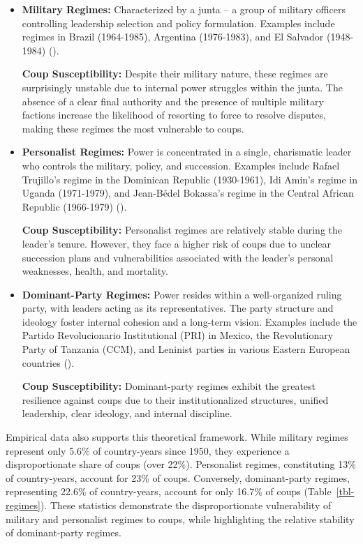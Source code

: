 \documentclass[
  12pt,
]{report}
\begin{document}
\begin{itemize}
\item
  \textbf{Military Regimes:} Characterized by a junta -- a group of
  military officers controlling leadership selection and policy
  formulation. Examples include regimes in Brazil (1964-1985), Argentina
  (1976-1983), and El Salvador (1948-1984)
  ().

  \textbf{Coup Susceptibility:} Despite their military nature, these
  regimes are surprisingly unstable due to internal power struggles
  within the junta. The absence of a clear final authority and the
  presence of multiple military factions increase the likelihood of
  resorting to force to resolve disputes, making these regimes the most
  vulnerable to coups.
\item
  \textbf{Personalist Regimes:} Power is concentrated in a single,
  charismatic leader who controls the military, policy, and succession.
  Examples include Rafael Trujillo's regime in the Dominican Republic
  (1930-1961), Idi Amin's regime in Uganda (1971-1979), and Jean-Bédel
  Bokassa's regime in the Central African Republic (1966-1979)
  ().

  \textbf{Coup Susceptibility:} Personalist regimes are relatively
  stable during the leader's tenure. However, they face a higher risk of
  coups due to unclear succession plans and vulnerabilities associated
  with the leader's personal weaknesses, health, and mortality.
\item
  \textbf{Dominant-Party Regimes:} Power resides within a well-organized
  ruling party, with leaders acting as its representatives. The party
  structure and ideology foster internal cohesion and a long-term
  vision. Examples include the Partido Revolucionario Institutional
  (PRI) in Mexico, the Revolutionary Party of Tanzania (CCM), and
  Leninist parties in various Eastern European countries
  ().

  \textbf{Coup Susceptibility:} Dominant-party regimes exhibit the
  greatest resilience against coups due to their institutionalized
  structures, unified leadership, clear ideology, and internal
  discipline.
\end{itemize}

Empirical data also supports this theoretical framework. While military
regimes represent only 5.6\% of country-years since 1950, they
experience a disproportionate share of coups (over 22\%). Personalist
regimes, constituting 13\% of country-years, account for 23\% of coups.
Conversely, dominant-party regimes, representing 22.6\% of
country-years, account for only 16.7\% of coups
(Table~\ref{tbl-regimes}). These statistics demonstrate the
disproportionate vulnerability of military and personalist regimes to
coups, while highlighting the relative stability of dominant-party
regimes.
\end{document}
